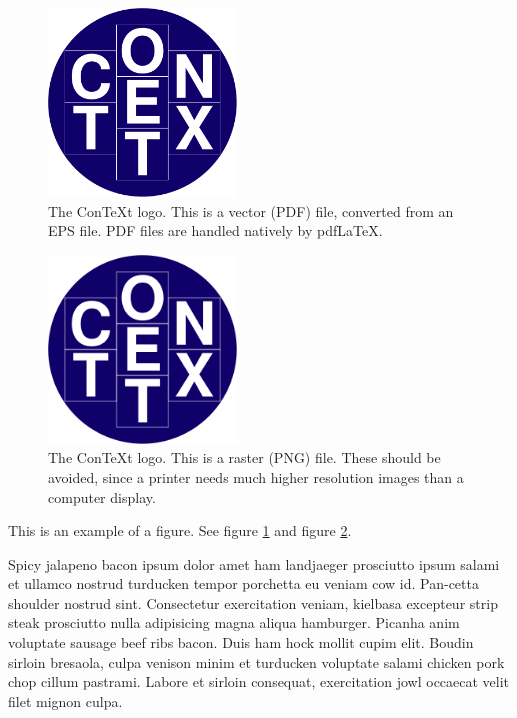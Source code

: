 \documentclass{article}
\begin{document}
\begin{figure}
  \centering
  \includegraphics[width=5cm]{images/ConTeXt_Unofficial_Logo} %
  \caption{The Con\TeX{t} logo. This is a vector (PDF) file, converted from an EPS file. PDF files are handled natively by pdf\LaTeX{}.}
  \label{fig-vector}
\end{figure}

\begin{figure}[h!] %
  \centering
  \includegraphics[width=5cm]{images/ConTeXt_Unofficial_Logo.png}
  \caption{The Con\TeX{t} logo. This is a raster (PNG) file. These should be avoided, since a printer needs much higher resolution images than a computer display.}
  \label{fig-raster}
\end{figure}

This is an example of a figure. See figure \ref{fig-vector} and figure \ref{fig-raster}.

 Spicy jalapeno bacon ipsum dolor amet ham landjaeger prosciutto ipsum salami et ullamco nostrud turducken tempor porchetta eu veniam cow id. Pan-cetta shoulder nostrud sint. Consectetur exercitation veniam, kielbasa excepteur strip steak prosciutto nulla adipisicing magna aliqua hamburger. Picanha anim voluptate sausage beef ribs bacon. Duis ham hock mollit cupim elit. Boudin sirloin bresaola, culpa venison minim et turducken voluptate salami chicken pork chop cillum pastrami. Labore et sirloin consequat, exercitation jowl occaecat velit filet mignon culpa.
\end{document}
